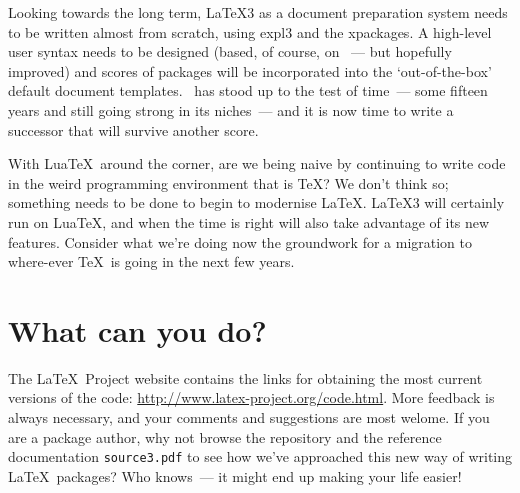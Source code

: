 \documentclass{ltnews}
\begin{document}
Looking towards the long term, \LaTeX3 as a document preparation system needs to be written almost from scratch, using \textsf{expl3} and the \textsf{xpackages}. A high-level user syntax needs to be designed (based, of course, on \LaTeXe~--- but hopefully improved) and scores of packages will be incorporated into the `out-of-the-box' default document templates. \LaTeXe\ has stood up to the test of time~--- some fifteen years and still going strong in its niches~--- and it is now time to write a successor that will survive another score.

With Lua\TeX\ around the corner, are we being naive by continuing to write code in the weird programming environment that is \TeX? We don't think so; something needs to be done to begin to modernise \LaTeX. \LaTeX3 will certainly run on Lua\TeX, and when the time is right will also take advantage of its new features. Consider what we're doing now the groundwork for a migration to where-ever \TeX\ is going in the next few years.

\section{What can you do?}

The \LaTeX~Project website contains the links for obtaining the most current versions of the code: \url{http://www.latex-project.org/code.html}. More feedback is always necessary, and your comments and suggestions are most welome. If you are a package author, why not browse the repository and the reference documentation \texttt{source3.pdf} to see how we've approached this new way of writing \LaTeX\ packages? Who knows~--- it might end up making your life easier!
\end{document}
